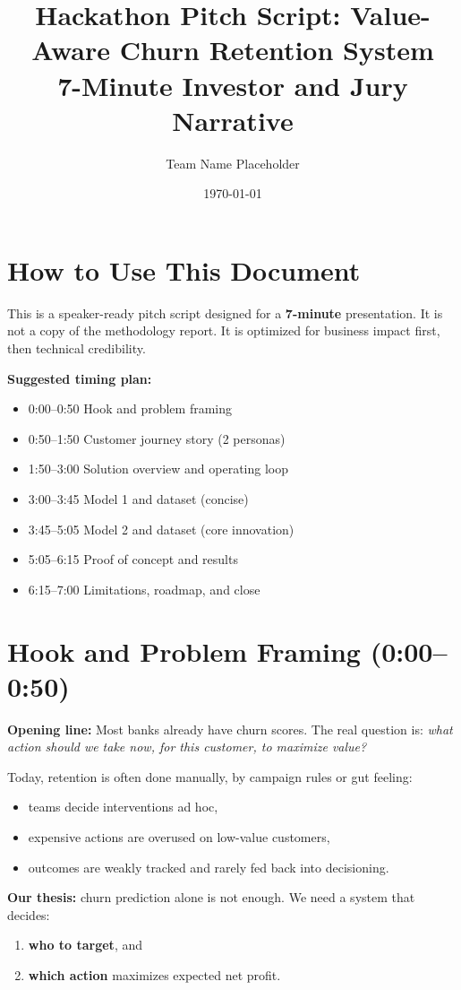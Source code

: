 \documentclass[11pt,a4paper]{article}
\title{Hackathon Pitch Script: Value-Aware Churn Retention System\\
\large 7-Minute Investor and Jury Narrative}
\author{Team Name Placeholder}
\date{\today}
\begin{document}
\maketitle

\section*{How to Use This Document}
This is a speaker-ready pitch script designed for a \textbf{7-minute} presentation. It is not a copy of the methodology report. It is optimized for business impact first, then technical credibility.

\textbf{Suggested timing plan:}
\begin{itemize}
    \item 0:00--0:50 Hook and problem framing
    \item 0:50--1:50 Customer journey story (2 personas)
    \item 1:50--3:00 Solution overview and operating loop
    \item 3:00--3:45 Model 1 and dataset (concise)
    \item 3:45--5:05 Model 2 and dataset (core innovation)
    \item 5:05--6:15 Proof of concept and results
    \item 6:15--7:00 Limitations, roadmap, and close
\end{itemize}

\section{Hook and Problem Framing (0:00--0:50)}
\textbf{Opening line:} Most banks already have churn scores. The real question is: \emph{what action should we take now, for this customer, to maximize value?}

Today, retention is often done manually, by campaign rules or gut feeling:
\begin{itemize}
    \item teams decide interventions ad hoc,
    \item expensive actions are overused on low-value customers,
    \item outcomes are weakly tracked and rarely fed back into decisioning.
\end{itemize}

\textbf{Our thesis:} churn prediction alone is not enough. We need a system that decides:
\begin{enumerate}
    \item \textbf{who to target}, and
    \item \textbf{which action} maximizes expected net profit.
\end{enumerate}
\end{document}
